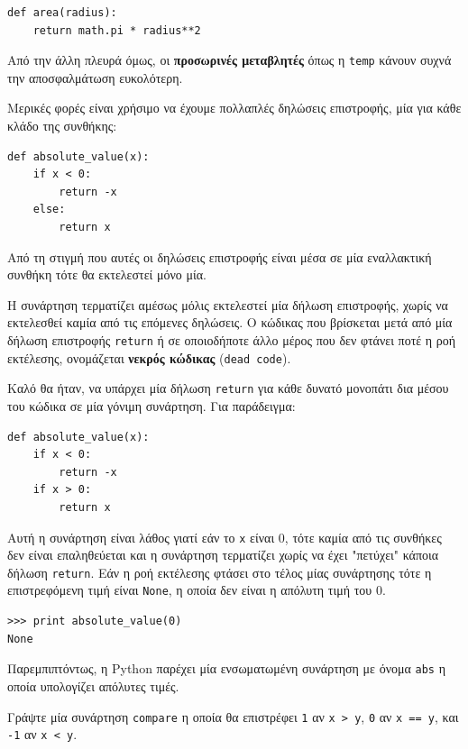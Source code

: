 \documentclass[10pt]{book}
\begin{document}
\begin{verbatim}
def area(radius):
    return math.pi * radius**2
\end{verbatim}
%

Από την άλλη πλευρά όμως, οι {\bf προσωρινές μεταβλητές} όπως η {\tt temp} 
κάνουν συχνά την αποσφαλμάτωση ευκολότερη.

Μερικές φορές είναι χρήσιμο να έχουμε πολλαπλές δηλώσεις επιστροφής, μία για κάθε κλάδο της συνθήκης:

\begin{verbatim}
def absolute_value(x):
    if x < 0:
        return -x
    else:
        return x
\end{verbatim}
%

Από τη στιγμή που αυτές οι δηλώσεις επιστροφής είναι μέσα σε μία εναλλακτική συνθήκη τότε θα εκτελεστεί μόνο μία.

Η συνάρτηση τερματίζει αμέσως μόλις εκτελεστεί μία δήλωση επιστροφής, χωρίς να εκτελεσθεί καμία από τις επόμενες δηλώσεις. Ο κώδικας που βρίσκεται μετά από μία δήλωση επιστροφής {\tt return} ή σε οποιοδήποτε άλλο μέρος που δεν φτάνει ποτέ η ροή εκτέλεσης, ονομάζεται {\bf νεκρός κώδικας} ({\tt dead code}).

Καλό θα ήταν, να υπάρχει μία δήλωση {\tt return} για κάθε δυνατό μονοπάτι δια μέσου του κώδικα σε μία γόνιμη συνάρτηση. Για παράδειγμα:

\begin{verbatim}
def absolute_value(x):
    if x < 0:
        return -x
    if x > 0:
        return x
\end{verbatim}
%

Αυτή η συνάρτηση είναι λάθος γιατί εάν το {\tt x} είναι 0, τότε
καμία από τις συνθήκες δεν είναι επαληθεύεται και η συνάρτηση τερματίζει
χωρίς να έχει "πετύχει" κάποια δήλωση {\tt return}. Εάν η ροή εκτέλεσης φτάσει στο τέλος μίας συνάρτησης τότε η επιστρεφόμενη τιμή είναι {\tt None}, η οποία δεν είναι η απόλυτη τιμή του 0.

\begin{verbatim}
>>> print absolute_value(0)
None
\end{verbatim}
%

Παρεμπιπτόντως, η Python παρέχει μία ενσωματωμένη συνάρτηση με
όνομα {\tt abs} η οποία υπολογίζει απόλυτες τιμές.\\

\begin{exercise}

Γράψτε μία συνάρτηση {\tt compare} η οποία θα επιστρέφει {\tt 1} αν {\tt x > y}, {\tt 0} αν {\tt x == y}, και {\tt -1} αν {\tt x < y}.
\end{exercise}
\end{document}
